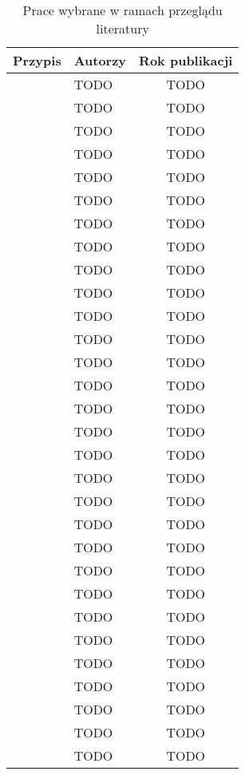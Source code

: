 \begin{table}[h!]
    \centering
    \begin{tabular}{|c|l|c|}
    \hline
    \textbf{Przypis} & \textbf{Autorzy} & \textbf{Rok publikacji} \\
    \hline
    \cite{9284261} & TODO & TODO \\
    \hline
    \cite{9235063} & TODO & TODO \\
    \hline
    \cite{8567674} & TODO & TODO \\
    \hline
    \cite{pawlik2019performanceconsiderationsexecutionlarge} & TODO & TODO \\
    \hline
    \cite{10.1145/3631295.3631394} & TODO & TODO \\
    \hline
    \cite{10.1145/3491204.3543506} & TODO & TODO \\
    \hline
    \cite{9284261} & TODO & TODO \\
    \hline
    \cite{8605777} & TODO & TODO \\
    \hline
    \cite{EBRAHIMI2024103115} & TODO & TODO \\
    \hline
    \cite{8605773} & TODO & TODO \\
    \hline
    \cite{Cordingly2020704} & TODO & TODO \\
    \hline
    \cite{shrestha2019lambda} & TODO & TODO \\
    \hline
    \cite{8116416} & TODO & TODO \\
    \hline
    \cite{9860368} & TODO & TODO \\
    \hline
    \cite{8605779} & TODO & TODO \\
    \hline
    \cite{8844428} & TODO & TODO \\
    \hline
    \cite{FerreiraDosSantos2023} & TODO & TODO \\
    \hline
    \cite{10.1145/3458336.3465305} & TODO & TODO \\
    \hline
    \cite{ritzal2020optimizing} & TODO & TODO \\
    \hline
    \cite{menéndez2023performancebestpracticesusing} & TODO & TODO \\
    \hline
    \cite{9095731} & TODO & TODO \\
    \hline
    \cite{9912641} & TODO & TODO \\
    \hline
    \cite{8605774} & TODO & TODO \\
    \hline
    \cite{10.1145/3377812.3382135} & TODO & TODO \\
    \hline
    \cite{aaaa} & TODO & TODO \\
    \hline
    \cite{aaaa} & TODO & TODO \\
    \hline
    \cite{aaaa} & TODO & TODO \\
    \hline
    \cite{aaaa} & TODO & TODO \\
    \hline
    \cite{aaaa} & TODO & TODO \\
    \hline
    \cite{aaaa} & TODO & TODO \\
    \hline
    \end{tabular}
    \caption{Prace wybrane w ramach przeglądu literatury}
\end{table}

